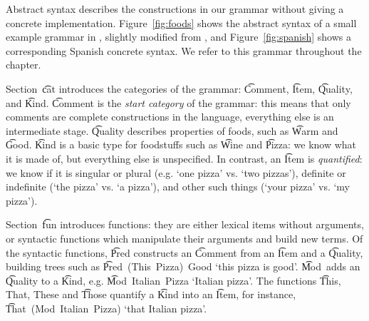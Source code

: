 Abstract syntax describes the constructions in our grammar without
giving a concrete implementation. Figure~\ref{fig:foods}
shows the abstract syntax of a small example grammar in \gf{}, slightly
modified from \citet{ranta2011gfbook}, and Figure~\ref{fig:spanish}
shows a corresponding Spanish concrete syntax. We refer to this
grammar throughout the chapter. 

Section~\t{cat} introduces the categories of the grammar: \t{Comment},
\t{Item},  \t{Quality}, and \t{Kind}.  \t{Comment} is the \emph{start
  category} of the grammar: this means that only comments are complete
constructions in the language, everything else is an intermediate
stage. \t{Quality} describes properties of foods, such as
\t{Warm} and \t{Good}. %
\t{Kind} is a basic type for foodstuffs such as \t{Wine} and
\t{Pizza}: we know what it is made of, but everything else is
unspecified. In contrast, an \t{Item} is \emph{quantified}: we know if
it is singular or plural (e.g. `one pizza' vs. `two pizzas'), definite or
indefinite (`the pizza' vs. `a pizza'), and other such things (`your
pizza' vs. `my pizza'). 

Section~\t{fun} introduces functions: they are either lexical
items without arguments, or syntactic functions which manipulate their
arguments and build new terms. Of the syntactic functions, \t{Pred}
constructs an \t{Comment} from an \t{Item} and a \t{Quality},
building trees such as \t{Pred~(This~Pizza)~Good} `this pizza is
good'. 
\t{Mod}~adds an \t{Quality} to a \t{Kind}, e.g. \t{Mod~Italian~Pizza}
`Italian pizza'. The functions  \t{This, That, These} 
and \t{Those} quantify a \t{Kind} into an \t{Item}, for instance,
\t{That~(Mod~Italian~Pizza)} `that Italian pizza'.

